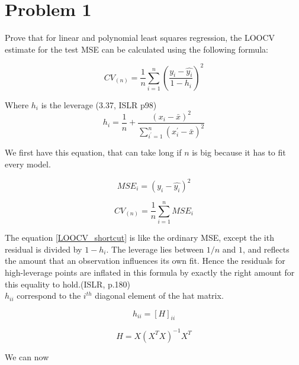 \section*{Problem 1}


\noindent Prove that for linear and polynomial least squares regression, the LOOCV estimate for the test MSE can be calculated using the following formula: 


\begin{equation}
\label{LOOCV_shortcut}
CV_{(n)} = \frac{1}{n} \sum_{i = 1}^{n}\left( \frac{y_i - \hat{y_i}}{1 - h_i} \right)^2
\end{equation}

\noindent Where $ h_i $ is the leverage (3.37, ISLR p98)
\begin{equation}
\label{leverage}
h_i = \frac{1}{n} + \frac{(x_i - \bar{x})^2}{\sum_{i^{'} = 1}^{n} (x_i^{'} - \bar{x})^2}
\end{equation}


\noindent We first have this equation, that can take long if $n$ is big because it has to fit every model.

\[ MSE_i = (y_i - \hat{y_i})^2 \]

\[ CV_{(n)} = \frac{1}{n} \sum_{i = 1}^{n} MSE_i \]


\noindent The equation \ref{LOOCV_shortcut} is like the ordinary MSE, except the ith residual is divided by $1-h_i$. The leverage lies between $1/n$ and $1$, and reflects the amount that an observation influences its own fit. Hence the residuals for high-leverage points are inflated in this formula by exactly the right amount for this equality to hold.(ISLR, p.180)\\

$h_{ii}$ correspond to the $i^{th}$ diagonal element of the hat matrix. 

\[ h_{ii} = [H]_{ii} \]

\[ H = X(X^T X)^{-1} X^T \]



\noindent We can now 
















